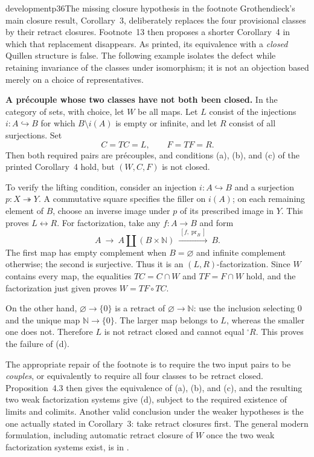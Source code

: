 \begin{dcomment}{development}{p36}{The missing closure hypothesis in the footnote}
Grothendieck's main closure result, Corollary~3, deliberately replaces the four provisional classes by their retract closures. Footnote~13 then proposes a shorter Corollary~4 in which that replacement disappears. As printed, its equivalence with a \emph{closed} Quillen structure is false. The following example isolates the defect while retaining invariance of the classes under isomorphism; it is not an objection based merely on a choice of representatives.

\textbf{A pr\'ecouple whose two classes have not both been closed.}\ours
In the category of sets, with choice, let $W$ be all maps. Let $L$ consist of the injections $i:A\hookrightarrow B$ for which $B\setminus i(A)$ is empty or infinite, and let $R$ consist of all surjections. Set
\[
C=TC=L,\qquad F=TF=R.
\]
Then both required pairs are pr\'ecouples, and conditions (a), (b), and (c) of the printed Corollary~4 hold, but $(W,C,F)$ is not closed.

To verify the lifting condition, consider an injection $i:A\hookrightarrow B$ and a surjection $p:X\twoheadrightarrow Y$. A commutative square specifies the filler on $i(A)$; on each remaining element of $B$, choose an inverse image under $p$ of its prescribed image in $Y$. This proves $L\longleftrightarrow R$. For factorization, take any $f:A\to B$ and form
\[
A\ \longrightarrow\ A\amalg(B\times\mathbb N)
  \ \xrightarrow{\ [f,\operatorname{pr}_B]\ }\ B.
\]
The first map has empty complement when $B=\varnothing$ and infinite complement otherwise; the second is surjective. Thus it is an $(L,R)$-factorization. Since $W$ contains every map, the equalities $TC=C\cap W$ and $TF=F\cap W$ hold, and the factorization just given proves $W=TF\circ TC$.

On the other hand, $\varnothing\to\{0\}$ is a retract of $\varnothing\to\mathbb N$: use the inclusion selecting $0$ and the unique map $\mathbb N\to\{0\}$. The larger map belongs to $L$, whereas the smaller one does not. Therefore $L$ is not retract closed and cannot equal ${}^{\square}R$. This proves the failure of (d).

The appropriate repair of the footnote is to require the two input pairs to be \emph{couples}, or equivalently to require all four classes to be retract closed. Proposition~4.3 then gives the equivalence of (a), (b), and (c), and the resulting two weak factorization systems give (d), subject to the required existence of limits and colimits. Another valid conclusion under the weaker hypotheses is the one actually stated in Corollary~3: take retract closures first. The general modern formulation, including automatic retract closure of $W$ once the two weak factorization systems exist, is in \citet[Definition~11.3.1 and Lemma~11.3.3]{Riehl2014}.


\end{dcomment}
